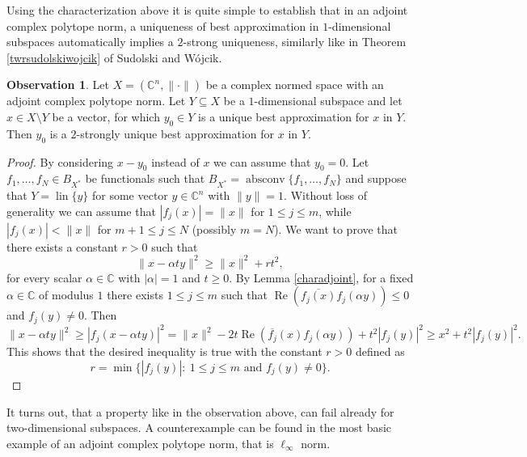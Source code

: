 \documentclass[12pt, reqno]{amsart}
\theoremstyle{definition}
\newtheorem{obs}[twr]{Observation}
\theoremstyle{remark}
\numberwithin{equation}{section}
\DeclareMathOperator{\absconv}{absconv}
\DeclareMathOperator{\lin}{lin}
\DeclareMathOperator{\re}{Re}
\begin{document}
Using the characterization above it is quite simple to establish that in an adjoint complex polytope norm, a uniqueness of best approximation in $1$-dimensional subspaces automatically implies a $2$-strong uniqueness, similarly like in Theorem \ref{twrsudolskiwojcik} of Sudolski and Wójcik.

\begin{obs}
\label{obs1dim}
Let $X=(\mathbb{C}^n, \| \cdot \|)$ be a complex normed space with an adjoint complex polytope norm. Let $Y \subseteq X$ be a $1$-dimensional subspace and let $x \in X \setminus Y$ be a vector, for which $y_0 \in Y$ is a unique best approximation for $x$ in $Y$. Then $y_0$ is a $2$-strongly unique best approximation for $x$ in $Y$.
\end{obs}

\begin{proof}

By considering $x-y_0$ instead of $x$ we can assume that $y_0=0$. Let $f_1, \ldots, f_N \in B_{X^*}$ be functionals such that $B_{X^*} = \absconv \{f_1, \ldots, f_N\}$ and suppose that $Y = \lin \{y\}$ for some vector $y \in \mathbb{C}^n$ with $\|y\|=1$. Without loss of generality we can assume that $|f_j(x)|=\|x\|$ for $1 \leq j \leq m$, while $|f_j(x)|<\|x\|$ for $m+1 \leq j \leq N$ (possibly $m=N$). We want to prove that there exists a constant $r>0$ such that
$$\|x-\alpha t y\|^2 \geq \|x\|^2 + rt^2,$$
for every scalar $\alpha \in \mathbb{C}$ with $|\alpha|=1$ and $t \geq 0$. By Lemma \ref{charadjoint}, for a fixed $\alpha \in \mathbb{C}$ of modulus $1$ there exists $1 \leq j \leq m$ such that $\re\left ( \overline{f_j(x)}f_j(\alpha y) \right ) \leq 0$ and $f_j(y) \neq 0$. Then
$$\|x - \alpha t y\|^2 \geq |f_j(x - \alpha t y)|^2 = \|x\|^2 - 2t \re\left ( \overline{f_j}(x)f_j(\alpha y) \right ) + t^2 |f_j(y)|^2  \geq x^2 + t^2|f_j(y)|^2.$$
This shows that the desired inequality is true with the constant $r>0$ defined as
$$r= \min\{|f_j(y)|: \ 1 \leq j \leq m \text { and } f_j(y) \neq 0\}.$$
\end{proof}

It turns out, that a property like in the observation above, can fail already for two-dimensional subspaces. A counterexample can be found in the most basic example of an adjoint complex polytope norm, that is $\ell_{\infty}$ norm.
\end{document}
